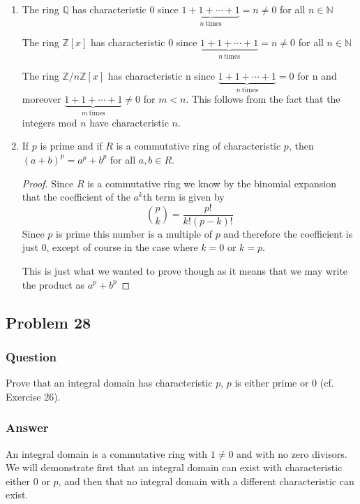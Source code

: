 \documentclass[12pt]{article}
\begin{document}
\begin{enumerate}
\item The ring $\mathbb{Q}$ has characteristic 0 since $\underbrace{1+1+\cdots+1}_{n \mathrm{\ times}}= n \neq 0$ for all $n \in \mathbb{N}$

The ring $\mathbb{Z}[x]$ has characteristic 0 since $\underbrace{1+1+\cdots+1}_{n \mathrm{\ times}}= n \neq 0$ for all $n \in \mathbb{N}$

The ring  $\mathbb{Z}/n\mathbb{Z}[x]$ has characteristic n since $\underbrace{1+1+\cdots+1}_{n \mathrm{\ times}}= 0$ for $\mathrm{n}$ and moreover $\underbrace{1+1+\cdots+1}_{m \mathrm{\ times}} \neq 0$ for $m<n$. This follows from the fact that the integers mod $n$ have characteristic $n$.

\item If $p$ is prime and if $R$ is a commutative ring of characteristic $p$, then $(a+b)^p = a^p+b^p$ for all $a, b \in R$. 

\begin{proof} Since $R$ is a commutative ring we know by the binomial expansion that the coefficient of the $a^k$th term is given by 
\[{ p \choose k} = \frac{p!}{k!(p-k)!} \]
Since $p$ is prime this number is a multiple of $p$ and therefore the coefficient is just 0, except of course in the case where $k=0 $ or $k=p$.

This is just what we wanted to prove though as it means that we may write the product as $a^p + b^p$
\end{proof}

\end{enumerate}



\subsection{Problem 28}
\subsubsection{Question}
Prove that an integral domain has characteristic $p$, $p$ is either prime or 0 (cf. Exercise 26). 

\subsubsection{Answer}
An integral domain is a commutative ring with $1 \neq 0$ and with no zero divisors. We will demonstrate first that an integral domain can exist with characteristic either $0$ or $p$, and then that no integral domain with a different characteristic can exist.
\end{document}
